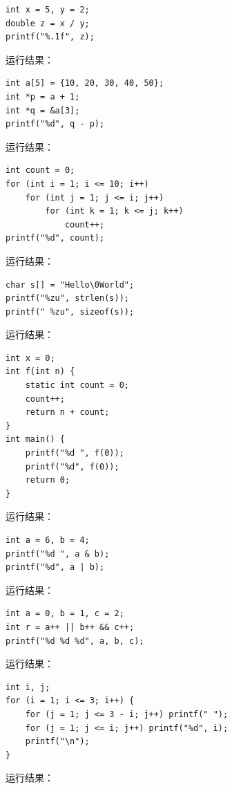 \documentclass[a4paper,11pt]{article}
\begin{document}
\q
\begin{lstlisting}[language={[custom]C}]
int x = 5, y = 2;
double z = x / y;
printf("%.1f", z);
\end{lstlisting}
运行结果：\underline{\hspace{3cm}}


\q
\begin{lstlisting}[language={[custom]C}]
int a[5] = {10, 20, 30, 40, 50};
int *p = a + 1;
int *q = &a[3];
printf("%d", q - p);
\end{lstlisting}
运行结果：\underline{\hspace{3cm}}


\q
\begin{lstlisting}[language={[custom]C}]
int count = 0;
for (int i = 1; i <= 10; i++)
    for (int j = 1; j <= i; j++)
        for (int k = 1; k <= j; k++)
            count++;
printf("%d", count);
\end{lstlisting}
运行结果：\underline{\hspace{3cm}}


\q
\begin{lstlisting}[language={[custom]C}]
char s[] = "Hello\0World";
printf("%zu", strlen(s));
printf(" %zu", sizeof(s));
\end{lstlisting}
运行结果：\underline{\hspace{3cm}}


\q
\begin{lstlisting}[language={[custom]C}]
int x = 0;
int f(int n) {
    static int count = 0;
    count++;
    return n + count;
}
int main() {
    printf("%d ", f(0));
    printf("%d", f(0));
    return 0;
}
\end{lstlisting}
运行结果：\underline{\hspace{3cm}}


\q
\begin{lstlisting}[language={[custom]C}]
int a = 6, b = 4;
printf("%d ", a & b);
printf("%d", a | b);
\end{lstlisting}
运行结果：\underline{\hspace{3cm}}


\q
\begin{lstlisting}[language={[custom]C}]
int a = 0, b = 1, c = 2;
int r = a++ || b++ && c++;
printf("%d %d %d", a, b, c);
\end{lstlisting}
运行结果：\underline{\hspace{3cm}}


\q
\begin{lstlisting}[language={[custom]C}]
int i, j;
for (i = 1; i <= 3; i++) {
    for (j = 1; j <= 3 - i; j++) printf(" ");
    for (j = 1; j <= i; j++) printf("%d", i);
    printf("\n");
}
\end{lstlisting}
运行结果：\underline{\hspace{3cm}}
\end{document}
